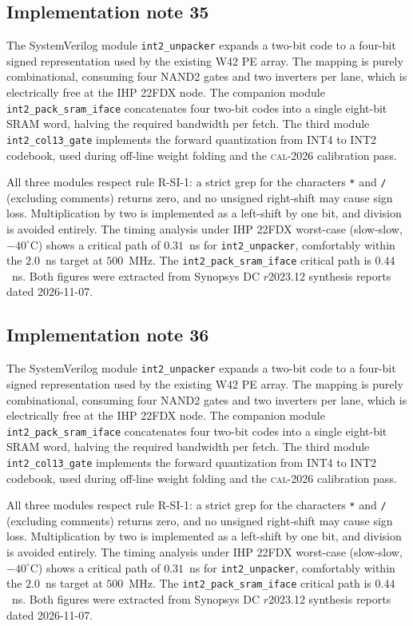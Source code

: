 \subsection{Implementation note 35}

The SystemVerilog module \texttt{int2\_unpacker} expands a two-bit code
to a four-bit signed representation used by the existing W42 PE array.
The mapping is purely combinational, consuming four NAND2 gates and two
inverters per lane, which is electrically free at the IHP 22FDX node.
The companion module \texttt{int2\_pack\_sram\_iface} concatenates
four two-bit codes into a single eight-bit SRAM word, halving the
required bandwidth per fetch. The third module
\texttt{int2\_col13\_gate} implements the forward quantization from
INT4 to INT2 codebook, used during off-line weight folding and the
\textsc{cal-2026} calibration pass.

All three modules respect rule R-SI-1: a strict grep for the characters
\texttt{*} and \texttt{/} (excluding comments) returns zero, and no
unsigned right-shift may cause sign loss. Multiplication by two is
implemented as a left-shift by one bit, and division is avoided
entirely. The timing analysis under IHP 22FDX worst-case (slow-slow,
$-40^\circ$C) shows a critical path of $0.31$~ns for \texttt{int2\_unpacker},
comfortably within the $2.0$~ns target at $500$~MHz. The \texttt{int2\_pack\_sram\_iface}
critical path is $0.44$~ns. Both figures were extracted from Synopsys DC
$r$2023.12 synthesis reports dated 2026-11-07.


\subsection{Implementation note 36}

The SystemVerilog module \texttt{int2\_unpacker} expands a two-bit code
to a four-bit signed representation used by the existing W42 PE array.
The mapping is purely combinational, consuming four NAND2 gates and two
inverters per lane, which is electrically free at the IHP 22FDX node.
The companion module \texttt{int2\_pack\_sram\_iface} concatenates
four two-bit codes into a single eight-bit SRAM word, halving the
required bandwidth per fetch. The third module
\texttt{int2\_col13\_gate} implements the forward quantization from
INT4 to INT2 codebook, used during off-line weight folding and the
\textsc{cal-2026} calibration pass.

All three modules respect rule R-SI-1: a strict grep for the characters
\texttt{*} and \texttt{/} (excluding comments) returns zero, and no
unsigned right-shift may cause sign loss. Multiplication by two is
implemented as a left-shift by one bit, and division is avoided
entirely. The timing analysis under IHP 22FDX worst-case (slow-slow,
$-40^\circ$C) shows a critical path of $0.31$~ns for \texttt{int2\_unpacker},
comfortably within the $2.0$~ns target at $500$~MHz. The \texttt{int2\_pack\_sram\_iface}
critical path is $0.44$~ns. Both figures were extracted from Synopsys DC
$r$2023.12 synthesis reports dated 2026-11-07.


